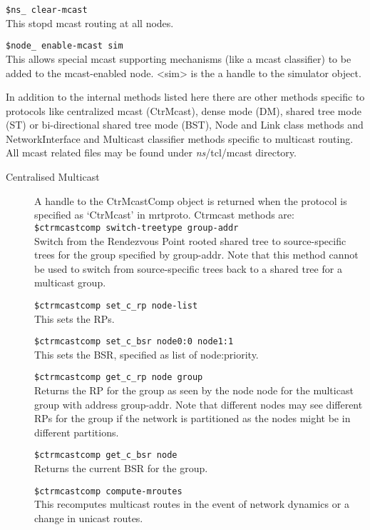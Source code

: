 \begin{flushleft}
{\tt \$ns\_ clear-mcast}\\
This stopd mcast routing at all nodes.


{\tt \$node\_ enable-mcast \<sim\>}\\
This allows special mcast supporting mechanisms (like a mcast classifier) to
be added to the mcast-enabled node. <sim> is the a handle to the simulator
object.

In addition to the internal methods listed here there are other methods specific to
protocols like centralized mcast (CtrMcast), dense mode (DM), shared tree
mode (ST) or bi-directional shared tree mode (BST), Node and Link class
methods and NetworkInterface and Multicast classifier methods specific to
multicast routing. All mcast related files may be found under
\emph{ns}/tcl/mcast directory. 
\begin{description}

\item[Centralised Multicast] A handle to the CtrMcastComp object is
returned when the protocol is specified as `CtrMcast' in mrtproto. 
Ctrmcast methods are: \\

{\tt \$ctrmcastcomp switch-treetype group-addr}\\
Switch from the Rendezvous Point rooted shared tree to source-specific
trees for the group specified by group-addr. Note that this method cannot
be used to switch from source-specific trees back to a shared tree for a
multicast group. 

{\tt \$ctrmcastcomp set\_c\_rp \<node-list\>}\\
This sets the RPs.

{\tt \$ctrmcastcomp set\_c\_bsr \<node0:0\> \<node1:1\>}\\
This sets the BSR, specified as list of node:priority.

{\tt \$ctrmcastcomp get\_c\_rp \<node\> \<group\>}\\
Returns the RP for the group as seen by the node node for the multicast
group with address group-addr. Note that different nodes may see different
RPs for the group if the network is partitioned as the nodes might be in
different partitions. 

{\tt \$ctrmcastcomp get\_c\_bsr \<node\>}\\
Returns the current BSR for the group.

{\tt \$ctrmcastcomp compute-mroutes}\\
This recomputes multicast routes in the event of network dynamics or a
change in unicast routes.



\end{description}
\end{flushleft}
